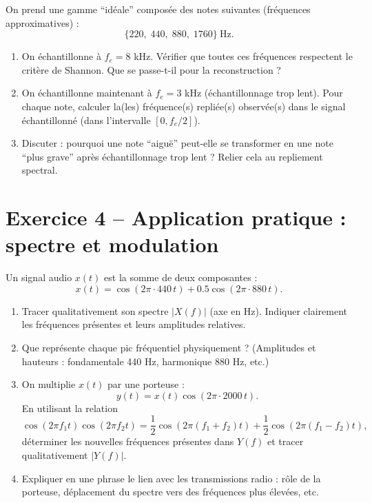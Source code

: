 On prend une gamme “idéale” composée des notes suivantes (fréquences approximatives) :
\[
\{220,\; 440,\; 880,\; 1760\}\ \text{Hz}.
\]

\begin{enumerate}[label=(\alph*)]
    \item On échantillonne à $f_e = 8$ kHz.  
    Vérifier que toutes ces fréquences respectent le critère de Shannon. Que se passe-t-il pour la reconstruction ?

    \item On échantillonne maintenant à $f_e = 3$ kHz (échantillonnage trop lent).  
    Pour chaque note, calculer la(les) fréquence(s) repliée(s) observée(s) dans le signal échantillonné (dans l’intervalle $[0,f_e/2]$).

    \item Discuter : pourquoi une note “aiguë” peut-elle se transformer en une note “plus grave” après échantillonnage trop lent ? Relier cela au repliement spectral.
\end{enumerate}

\section*{Exercice 4 – Application pratique : spectre et modulation}

Un signal audio $x(t)$ est la somme de deux composantes :
\[
x(t) = \cos(2\pi \cdot 440\, t) + 0.5\cos(2\pi \cdot 880\, t).
\]

\begin{enumerate}[label=(\alph*)]
    \item Tracer qualitativement son spectre $|X(f)|$ (axe en Hz).  
    Indiquer clairement les fréquences présentes et leurs amplitudes relatives.

    \item Que représente chaque pic fréquentiel physiquement ?  
    (Amplitudes et hauteurs : fondamentale 440 Hz, harmonique 880 Hz, etc.)

    \item On multiplie $x(t)$ par une porteuse :
    \[
    y(t) = x(t)\cos(2\pi \cdot 2000\,t).
    \]
    En utilisant la relation
    \[
    \cos(2\pi f_1 t)\cos(2\pi f_2 t) = \frac{1}{2}\cos(2\pi(f_1+f_2)t) + \frac{1}{2}\cos(2\pi(f_1-f_2)t),
    \]
    déterminer les nouvelles fréquences présentes dans $Y(f)$ et tracer qualitativement $|Y(f)|$.

    \item Expliquer en une phrase le lien avec les transmissions radio : rôle de la porteuse, déplacement du spectre vers des fréquences plus élevées, etc.
\end{enumerate}
